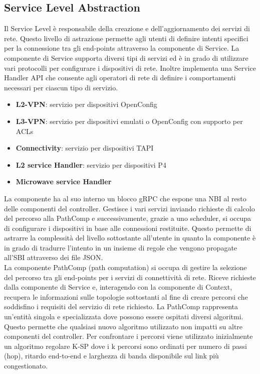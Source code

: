 \subsection{Service Level Abstraction}
Il Service Level è responsabile della creazione e dell'aggiornamento dei servizi di rete.
Questo livello di astrazione permette agli utenti di definire intenti specifici per la connessione tra gli end-points attraverso la componente di Service.
La componente di Service supporta diversi tipi di servizi ed è in grado di utilizzare vari protocolli per configurare i dispositivi di rete.
Inoltre implementa una Service Handler API che consente agli operatori di rete di definire i comportamenti necessari per ciascun tipo di servizio.
\begin{itemize}
    \item \textbf{L2-VPN}: servizio per dispositivi OpenConfig
    \item \textbf{L3-VPN}: servizio per dispositivi emulati o OpenConfig con supporto per ACLs
    \item \textbf{Connectivity}: servizio per dispositivi TAPI
    \item \textbf{L2 service Handler}: servizio per dispositivi P4
    \item \textbf{Microwave service Handler}
\end{itemize}
La componente ha al suo interno un blocco gRPC che espone una NBI al resto delle componenti del controller. 
Gestisce i vari servizi inviando richieste di calcolo del percorso alla PathComp e successivamente, grazie a uno scheduler, si occupa di
configurare i dispositivi in base alle connessioni restituite. Questo permette di astrarre la complessità del livello sottostante all'utente
in quanto la componente è in grado di tradurre l'intento in un insieme di regole che vengono propagate all'SBI attraverso dei file JSON.
\\La componente PathComp (path computation) si occupa di gestire la selezione del percorso tra gli end-points per i servizi di connettività di rete. 
Riceve richieste dalla componente di Service e, interagendo con la componente di Context, recupera le informazioni sulle topologie sottostanti al fine di creare
percorsi che soddisfino i requisiti del servizio di rete richiesto.
La PathComp rappresenta un'entità singola e specializzata dove possono essere ospitati diversi algoritmi. Questo permette che qualsiasi nuovo algoritmo utilizzato non impatti su altre componenti del controller.
Per confrontare i percorsi viene utilizzato inizialmente un algoritmo regolare K-SP dove i k percorsi sono ordinati per numero di passi (hop), ritardo end-to-end e larghezza di banda disponibile sul link più congestionato. 

